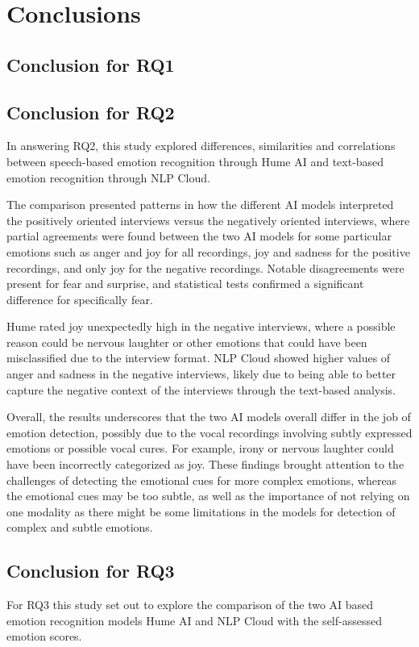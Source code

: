 \section{Conclusions}
\subsection{Conclusion for RQ1}

\subsection{Conclusion for RQ2}
In answering RQ2, this study explored differences, similarities and correlations between speech-based emotion recognition through Hume AI and text-based emotion recognition through NLP Cloud.

The comparison presented patterns in how the different AI models interpreted the positively oriented interviews versus the negatively oriented interviews, where partial agreements were found between the two AI models for some particular emotions such as anger and joy for all recordings, joy and sadness for the positive recordings, and only joy for the negative recordings. Notable disagreements were present for fear and surprise, and statistical tests confirmed a significant difference for specifically fear.

Hume rated joy unexpectedly high in the negative interviews, where a possible reason could be nervous laughter or other emotions that could have been misclassified due to the interview format. NLP Cloud showed higher values of anger and sadness in the negative interviews, likely due to being able to better capture the negative context of the interviews through the text-based analysis.

Overall, the results underscores that the two AI models overall differ in the job of emotion detection, possibly due to the vocal recordings involving subtly expressed emotions or possible vocal cures. For example, irony or nervous laughter could have been incorrectly categorized as joy. These findings brought attention to the challenges of detecting the emotional cues for more complex emotions, whereas the emotional cues may be too subtle, as well as the importance of not relying on one modality as there might be some limitations in the models for detection of complex and subtle emotions.

\subsection{Conclusion for RQ3}
For RQ3 this study set out to explore the comparison of the two AI based emotion recognition models Hume AI and NLP Cloud with the self-assessed emotion scores. 

